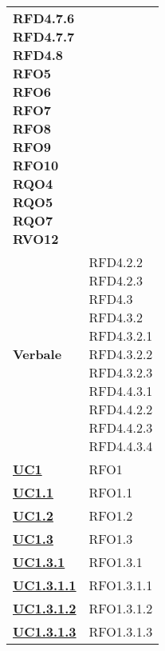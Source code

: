 \begin{longtable}[H]{| >{\centering\bfseries}p{8cm} | >{\centering\arraybackslash}p{8cm} |}
{            RFD4.7.6 \\
            RFD4.7.7 \\
            RFD4.8 \\
            RFO5 \\
            RFO6 \\
            RFO7 \\
            RFO8 \\
            RFO9 \\
            RFO10 \\
            RQO4 \\
            RQO5 \\
            RQO7 \\
            RVO12
        } \\

    Verbale &
        \makecell{
            RFD4.2.2 \\
            RFD4.2.3 \\
            RFD4.3 \\
            RFD4.3.2\\
            RFD4.3.2.1 \\
            RFD4.3.2.2 \\
            RFD4.3.2.3 \\
            RFD4.4.3.1 \\
            RFD4.4.2.2 \\
            RFD4.4.2.3 \\
            RFD4.4.3.4
        } \\

    \hyperref[sub:uc1]{UC1} & RFO1 \\

    \hyperref[ssub:uc1.1]{UC1.1} & RFO1.1 \\

    \hyperref[ssub:uc1.2]{UC1.2} &  RFO1.2\\

    \hyperref[ssub:uc1.3]{UC1.3} & RFO1.3 \\

    \hyperref[par:uc1.3.1]{UC1.3.1} & RFO1.3.1 \\

    \hyperref[spar:uc1.3.1.1]{UC1.3.1.1} & RFO1.3.1.1 \\

    \hyperref[spar:uc1.3.1.2]{UC1.3.1.2} & RFO1.3.1.2 \\

    \hyperref[spar:uc1.3.1.3]{UC1.3.1.3} & RFO1.3.1.3 \\


\end{longtable}
